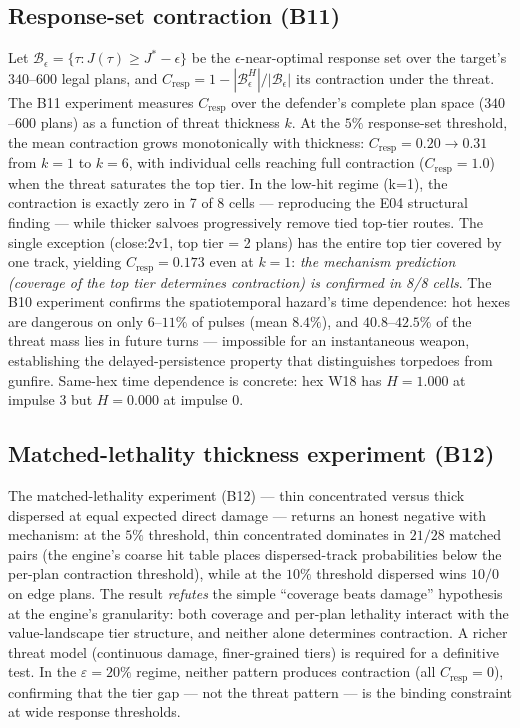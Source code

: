 \documentclass[12pt,a4paper]{article}
\begin{document}
\subsection{Response-set contraction (B11)}
Let $\mathcal B_\epsilon=\{\tau: J(\tau)\ge J^\ast-\epsilon\}$ be the
$\epsilon$-near-optimal response set over the target's $340$--$600$ legal
plans, and
$C_{\text{resp}}=1-|\mathcal B_\epsilon^{H}|/|\mathcal B_\epsilon|$
its contraction under the threat.  The B11 experiment measures $C_{\text{resp}}$ over the defender's
complete plan space ($340$--$600$ plans) as a function of threat
thickness $k$.  At the $5\%$ response-set threshold, the mean
contraction grows monotonically with thickness: $C_{\text{resp}} =
0.20 \to 0.31$ from $k=1$ to $k=6$, with individual cells reaching
full contraction ($C_{\text{resp}} = 1.0$) when the threat saturates
the top tier.  In the low-hit regime (k=1), the contraction is exactly
zero in 7 of 8 cells --- reproducing the E04 structural finding --- while
thicker salvoes progressively remove tied top-tier routes.  The single
exception (close:2v1, top tier = 2 plans) has the entire top tier
covered by one track, yielding $C_{\text{resp}} = 0.173$ even at
$k=1$: \emph{the mechanism prediction (coverage of the top tier
determines contraction) is confirmed in 8/8 cells}.  The B10
experiment confirms the spatiotemporal hazard's time dependence: hot
hexes are dangerous on only $6$--$11\%$ of pulses (mean $8.4\%$),
and $40.8$--$42.5\%$ of the threat mass lies in future turns ---
impossible for an instantaneous weapon, establishing the
delayed-persistence property that distinguishes torpedoes from
gunfire.  Same-hex time dependence is concrete: hex W18 has
$H=1.000$ at impulse 3 but $H=0.000$ at impulse 0.

\subsection{Matched-lethality thickness experiment (B12)}
The matched-lethality experiment (B12) --- thin concentrated versus
thick dispersed at equal expected direct damage --- returns an honest
negative with mechanism: at the $5\%$ threshold, thin concentrated
dominates in $21/28$ matched pairs (the engine's coarse hit table
places dispersed-track probabilities below the per-plan contraction
threshold), while at the $10\%$ threshold dispersed wins $10/0$ on
edge plans.  The result \emph{refutes} the simple ``coverage beats
damage'' hypothesis at the engine's granularity: both coverage and
per-plan lethality interact with the value-landscape tier structure,
and neither alone determines contraction.  A richer threat model
(continuous damage, finer-grained tiers) is required for a definitive
test.  In the $\varepsilon=20\%$ regime, neither pattern produces
contraction (all $C_{\text{resp}}=0$), confirming that the tier
gap --- not the threat pattern --- is the binding constraint at wide
response thresholds.
\end{document}
